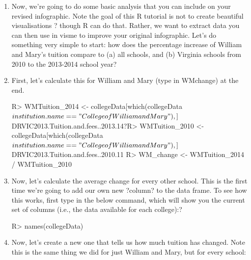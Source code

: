 \documentclass{article}
\newenvironment{Schunk}{}{}
\newcommand{\proglang}[1]{\textsf{#1}}
\begin{document}
{\begin{enumerate}[leftmargin=15mm]
\vspace{4mm}
\setlength{\leftskip}{0cm}
\textit{Analysis}

\item Now, we're going to do some basic analysis that you can include on your revised infographic.  Note the goal of this \proglang{R} tutorial is not to create beautiful visualisations ? though \proglang{R} can do that.  Rather, we want to extract data you can then use in visme to improve your original infographic.  Let's do something very simple to start: how does the percentage increase of William and Mary's tuition compare to (a) all schools, and (b) Virginia schools from 2010 to the 2013-2014 school year?

\item First, let's calculate this for William and Mary (type in WMchange) at the end.

\begin{Schunk}
\begin{Sinput}
R> WMTuition_2014 <- collegeData[which(collegeData$institution.name=="College of William and Mary"),]$DRVIC2013.Tuition.and.fees..2013.14?R> WMTuition_2010 <- collegeData[which(collegeData$institution.name=="College of William and Mary"),]$DRVIC2013.Tuition.and.fees..2010.11
R> WM_change <- WMTuition_2014 / WMTuition_2010
\end{Sinput}
\end{Schunk}

\item Now, let's calculate the average change for every other school.  This is the first time we're going to add our own new ?column? to the data frame.  To see how this works, first type in the below command, which will show you the current set of columns (i.e., the data available for each college):?
\begin{Schunk}
\begin{Sinput}
R> names(collegeData)
\end{Sinput}
\end{Schunk}

\item Now, let's create a new one that tells us how much tuition has changed.  Note this is the same thing we did for just William and Mary, but for every school:

\begin{Schunk}
\end{Schunk}


\end{enumerate}}
\end{document}
